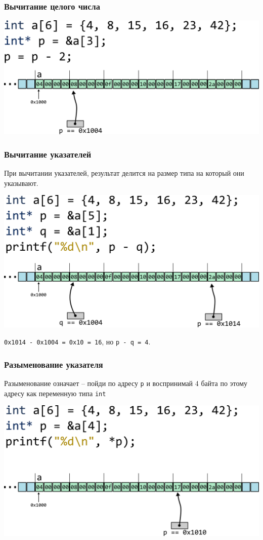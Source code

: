 \documentclass[10pt,pdf,hyperref={unicode}]{beamer}
\begin{document}
\begin{frame}[fragile]
\frametitle{Вычитание целого числа} 
\begin{center}
\includegraphics[width=0.95\linewidth]{../images/pointer_arithmetics/parithmetics_3_subtraction.png}
\end{center}
\end{frame}

\begin{frame}[fragile]
\frametitle{Вычитание указателей} 
При вычитании указателей, результат делится на размер типа на который они указывают.
\begin{center}
\includegraphics[width=0.86\linewidth]{../images/pointer_arithmetics/parithmetics_4_pointer_subtraction.png}
\end{center}
\texttt{0x1014 - 0x1004 = 0x10 = 16}, но \texttt{p - q = 4}.
\end{frame}


\begin{frame}[fragile]
\frametitle{Разыменование указателя}
Разыменование означает -- пойди по адресу \texttt{p} и воспринимай 4 байта по этому адресу как
переменную типа \texttt{int}
\begin{center}
\includegraphics[width=0.86\linewidth]{../images/pointer_arithmetics/parithmetics_5_dereferencing.png}
\end{center}
\end{frame}
\end{document}
